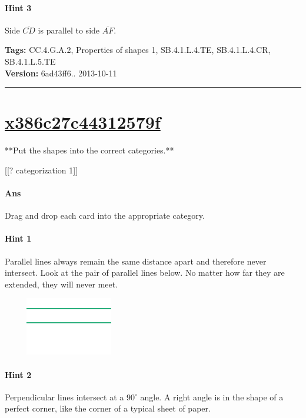 \documentclass[twocolumn,10pt]{article}
\def\shrinkfactor{0.55}
\begin{document}
\paragraph{Hint 3}Side $\overline{CD}$ is parallel to side $\overline{AF}$.



\medskip
\noindent
\textbf{Tags:} {\footnotesize CC.4.G.A.2, Properties of shapes 1, SB.4.1.L.4.TE, SB.4.1.L.4.CR, SB.4.1.L.5.TE}\\
\textbf{Version:} 6ad43ff6.. 2013-10-11
\smallskip\hrule





\section{\href{https://www.khanacademy.org/devadmin/content/items/x386c27c44312579f}{x386c27c44312579f}}

\noindent
**Put the shapes into the correct categories.**

[[? categorization 1]]


\paragraph{Ans} Drag and drop each card into the appropriate category. 

\paragraph{Hint 1}Parallel lines always remain the same distance apart and therefore never intersect.  Look at the pair of parallel lines below.  No matter how far they are extended, they will never meet.

$\phantom{xxxx}$
\includegraphics[scale=\shrinkfactor]{figures/7cf1fbfb7516a57d37ad80007a3886c81c33f393.png}

\paragraph{Hint 2} Perpendicular lines intersect at a $90 ^\circ$ angle.  
A right angle is in the shape of a perfect corner, like the corner of a typical sheet of paper.
\end{document}
